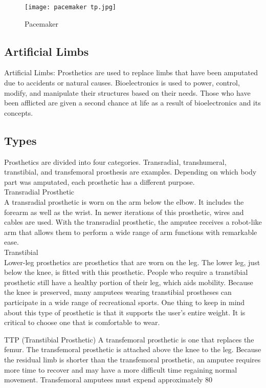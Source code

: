 \documentclass[12pt]{report}
\begin{document}
\begin{figure}[h]
\centering
\texttt{[image: pacemaker tp.jpg]}
\caption{Pacemaker}
\end{figure}

\subsection{Artificial Limbs}
Artificial Limbs: Prosthetics are used to replace limbs that have been amputated due to accidents or natural causes. Bioelectronics is used to power, control, modify, and manipulate their structures based on their needs. Those who have been afflicted are given a second chance at life as a result of bioelectronics and its concepts.

\subsection{Types}

Prosthetics are divided into four categories. Transradial, transhumeral, transtibial, and transfemoral prosthesis are examples. Depending on which body part was amputated, each prosthetic has a different purpose.\\

Transradial Prosthetic\\
A transradial prosthetic is worn on the arm below the elbow. It includes the forearm as well as the wrist. In newer iterations of this prosthetic, wires and cables are used. With the transradial prosthetic, the amputee receives a robot-like arm that allows them to perform a wide range of arm functions with remarkable ease.\\

Transtibial\\
Lower-leg prosthetics are prosthetics that are worn on the leg.
The lower leg, just below the knee, is fitted with this prosthetic. People who require a transtibial prosthetic still have a healthy portion of their leg, which aids mobility. Because the knee is preserved, many amputees wearing transtibial prostheses can participate in a wide range of recreational sports. One thing to keep in mind about this type of prosthetic is that it supports the user's entire weight. It is critical to choose one that is comfortable to wear.

TTP (Transtibial Prosthetic)
A transfemoral prosthetic is one that replaces the femur.
The transfemoral prosthetic is attached above the knee to the leg. Because the residual limb is shorter than the transfemoral prosthetic, an amputee requires more time to recover and may have a more difficult time regaining normal movement. Transfemoral amputees must expend approximately 80%
\end{document}
